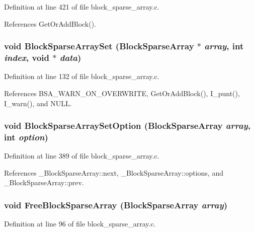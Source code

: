 Definition at line 421 of file block\_\-sparse\_\-array.c.

References Get\-Or\-Add\-Block().
\subsubsection{\setlength{\rightskip}{0pt plus 5cm}void Block\-Sparse\-Array\-Set (\bf{Block\-Sparse\-Array} $\ast$ {\em array}, int {\em index}, void $\ast$ {\em data})}\label{block__sparse__array_8h_1cbcf4fa36138a9fd05f2517fc2fe5ea}




Definition at line 132 of file block\_\-sparse\_\-array.c.

References BSA\_\-WARN\_\-ON\_\-OVERWRITE, Get\-Or\-Add\-Block(), I\_\-punt(), I\_\-warn(), and NULL.
\subsubsection{\setlength{\rightskip}{0pt plus 5cm}void Block\-Sparse\-Array\-Set\-Option (\bf{Block\-Sparse\-Array} {\em array}, int {\em option})}\label{block__sparse__array_8h_8a80d175ad7bb329b089b3e9de62a2c7}




Definition at line 389 of file block\_\-sparse\_\-array.c.

References \_\-Block\-Sparse\-Array::next, \_\-Block\-Sparse\-Array::options, and \_\-Block\-Sparse\-Array::prev.
\subsubsection{\setlength{\rightskip}{0pt plus 5cm}void Free\-Block\-Sparse\-Array (\bf{Block\-Sparse\-Array} {\em array})}\label{block__sparse__array_8h_7291c7747788fe0ae7e0bd8a0284f852}




Definition at line 96 of file block\_\-sparse\_\-array.c.

